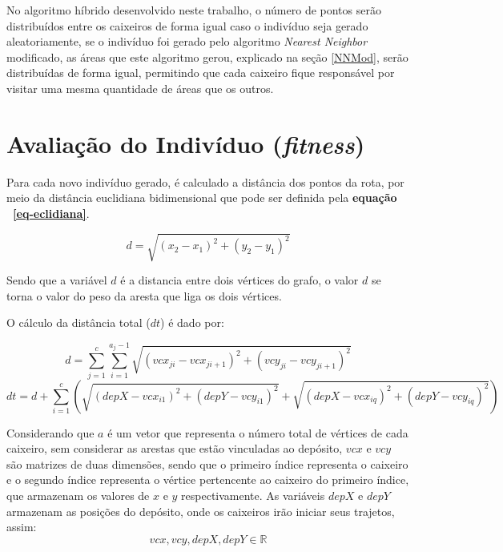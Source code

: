 \documentclass[12pt,openright,a4paper,twoside]{tcc}
\begin{document}
            No algoritmo híbrido desenvolvido neste trabalho, o número de pontos serão distribuídos entre os caixeiros de forma igual caso o indivíduo seja gerado aleatoriamente, se o indivíduo foi gerado pelo algoritmo \textit{Nearest Neighbor} modificado, as áreas que este algoritmo gerou, explicado na seção \ref{NNMod}, serão distribuídas de forma igual, permitindo que cada caixeiro fique responsável por visitar uma mesma quantidade de áreas que os outros.
		       
	   	
	   	\section{Avaliação do Indivíduo (\textit{fitness})}

		Para cada novo indivíduo gerado, é calculado a distância dos pontos da rota, por meio da distância euclidiana bidimensional que pode ser definida pela \textbf{equação ~\ref{eq-eclidiana}}.

		\begin{equation}
			d = \sqrt{(x_2-x_1)^2 + (y_2-y_1)^2}
			\label{eq-eclidiana}
		\end{equation}

		Sendo que a variável $d$ é a distancia entre dois vértices do grafo, o valor $d$ se torna o valor do peso da aresta que liga os dois vértices.

		O cálculo da distância total ($dt$) é dado por:

		\begin{equation}
			d = \sum_{j=1}^{c} \sum_{i=1}^{a_j-1} \sqrt{(vcx_{ji}-vcx_{ji+1})^2 + (vcy_{ji}-vcy_{ji+1})^2}
			\label{eq-ecli1}
		\end{equation}
		\begin{equation}
			dt = d + \sum_{i=1}^{c} (\sqrt{(depX-vcx_{i1})^2 + (depY-vcy_{i1})^2} + \sqrt{(depX-vcx_{iq})^2 + (depY-vcy_{iq})^2})
			\label{eq-ecli2}
		\end{equation}

		Considerando que $a$ é um vetor que representa o número total de vértices de cada caixeiro, sem considerar as  arestas que estão vinculadas ao depósito, $vcx$ e $vcy$ são matrizes de duas dimensões, sendo que o primeiro índice representa o caixeiro e o segundo índice representa o vértice pertencente ao caixeiro do primeiro índice, que armazenam os valores de $x$ e $y$ respectivamente. As variáveis $depX$ e $depY$ armazenam as posições do depósito, onde os caixeiros irão iniciar seus trajetos, assim:
		\begin{equation}
			vcx, vcy, depX, depY \in \mathbb{R}   
			\label{eq-ecli4}
		\end{equation}
\end{document}
